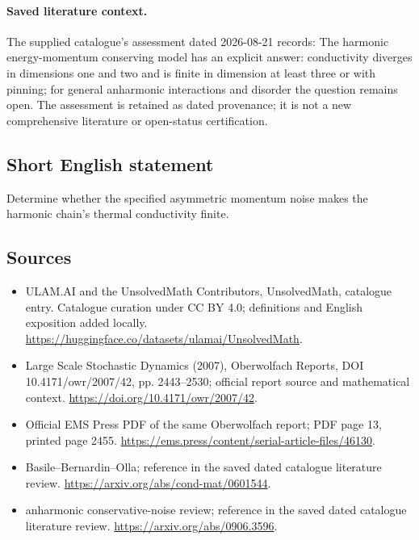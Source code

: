 \documentclass[11pt]{article}
\begin{document}
\paragraph{Saved literature context.} The supplied catalogue's assessment dated 2026-08-21 records: The harmonic energy-momentum conserving model has an explicit answer: conductivity diverges in dimensions one and two and is finite in dimension at least three or with pinning; for general anharmonic interactions and disorder the question remains open. The assessment is retained as dated provenance; it is not a new comprehensive literature or open-status certification.
\subsection{Short English statement}
Determine whether the specified asymmetric momentum noise makes the harmonic chain's thermal conductivity finite.
\subsection{Sources}
\begin{itemize}
\item[\hypertarget{source:statement:1}{S1}] ULAM.AI and the UnsolvedMath Contributors, UnsolvedMath, catalogue entry. Catalogue curation under CC BY 4.0; definitions and English exposition added locally.
\url{https://huggingface.co/datasets/ulamai/UnsolvedMath}.
\item[\hypertarget{source:statement:2}{S2}] Large Scale Stochastic Dynamics (2007), Oberwolfach Reports, DOI 10.4171/owr/2007/42, pp. 2443--2530; official report source and mathematical context.
\url{https://doi.org/10.4171/owr/2007/42}.
\item[\hypertarget{source:statement:3}{S3}] Official EMS Press PDF of the same Oberwolfach report; PDF page 13, printed page 2455.
\url{https://ems.press/content/serial-article-files/46130}.
\item[\hypertarget{source:statement:4}{S4}] Basile--Bernardin--Olla; reference in the saved dated catalogue literature review.
\url{https://arxiv.org/abs/cond-mat/0601544}.
\item[\hypertarget{source:statement:5}{S5}] anharmonic conservative-noise review; reference in the saved dated catalogue literature review.
\url{https://arxiv.org/abs/0906.3596}.
\end{itemize}
\label{end:statement}
\end{document}
